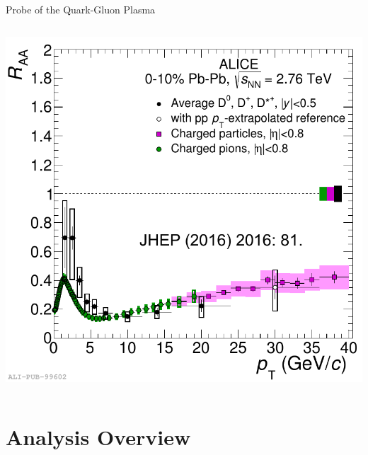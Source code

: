 \documentclass[xcolor={usenames,dvipsnames}]{beamer}
\begin{document}
\begin{frame}{Probe of the Quark-Gluon Plasma}
\begin{columns}
\includegraphics[width=\textwidth]{img/ALICE_DMesonRAA}
\end{columns}
\end{frame}

\section{Analysis Overview}
\end{document}
